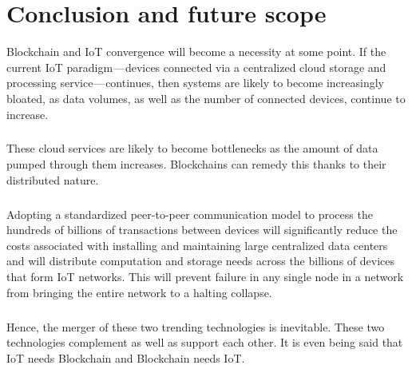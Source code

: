 
\chapter{Conclusion and future scope}

Blockchain and IoT convergence will become a necessity at some point. If the current IoT paradigm — devices connected via a centralized cloud storage and processing service — continues, then systems are likely to become increasingly bloated, as data volumes, as well as the number of connected devices, continue to increase.

\paragraph{}These cloud services are likely to become bottlenecks as the amount of data pumped through them increases. Blockchains can remedy this thanks to their distributed nature.

\paragraph{}Adopting a standardized peer-to-peer communication model to process the hundreds of billions of transactions between devices will significantly reduce the costs associated with installing and maintaining large centralized data centers and will distribute computation and storage needs across the billions of devices that form IoT networks. This will prevent failure in any single node in a network from bringing the entire network to a halting collapse.

\paragraph{}Hence, the merger of these two trending technologies is inevitable. These two technologies complement as well as support each other. It is even being said that IoT needs Blockchain and Blockchain needs IoT.


